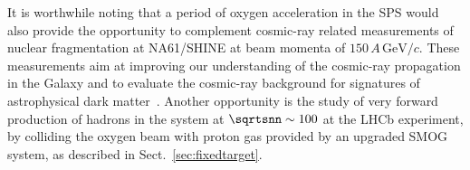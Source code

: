 \documentclass[../report.tex]{subfiles}
\providecommand{\main}{..}
\begin{document}
It is worthwhile noting that a period of oxygen acceleration in the SPS would also provide the opportunity to complement cosmic-ray related measurements of nuclear fragmentation at NA61/SHINE\cite{Aduszkiewicz:2287004,Aduszkiewicz:2309890} at beam momenta of $150\,A\,\text{GeV}/c$. These measurements aim at improving our understanding of the cosmic-ray propagation in the Galaxy and to evaluate the cosmic-ray background for signatures of astrophysical dark matter~\cite{Genolini:2018ekk}. Another opportunity is the study of very forward production of hadrons in the \pO system at $\sqrtsnn \sim 100$ at the LHCb experiment, by colliding the oxygen beam with proton gas provided by an upgraded SMOG system, as described in Sect.~\ref{sec:fixedtarget}.





\end{document}
